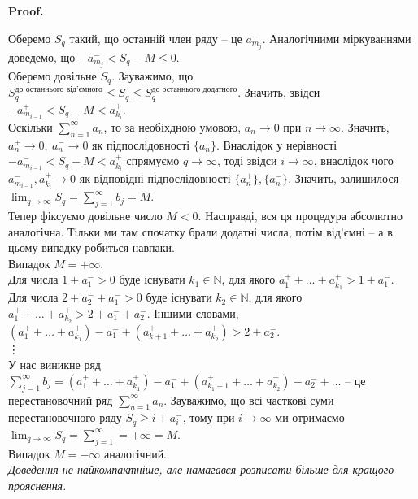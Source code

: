 \documentclass[a4paper, 10pt]{article}
\makeatletter
\def\qed{$\blacksquare$}
\theoremstyle{theoremdd}
\theoremstyle{theoremdd}
\theoremstyle{theoremdd}
\theoremstyle{theoremdd}
\theoremstyle{theoremdd}
\theoremstyle{theoremdd}
\theoremstyle{theoremdd}
\theoremstyle{theoremdd}
\theoremstyle{theoremdd}
\renewenvironment{proof}[1][Proof.\\]{\par
\pushQED{\hfill \qed}%
\normalfont \topsep6\p@\@plus6\p@\relax
\trivlist
\item\relax
{\bfseries
#1\@addpunct{.}}\hspace\labelsep\ignorespaces
}{%
\popQED\endtrivlist\@endpefalse
}
\makeatother
\begin{document}
\begin{proof}
Оберемо $S_q$ такий, що останній член ряду -- це $a_{m_j}^-$. Аналогічними міркуваннями доведемо, що $-a_{m_j}^- < S_q - M \leq 0$.\\
Оберемо довільне $S_q$. Зауважимо, що $S^{\text{до останнього від'ємного}}_{q} \leq S_q \leq S_q^{\text{до останнього додатного}}$. Значить, звідси\\
$-a_{m_{i-1}}^+ < S_q - M < a_{k_i}^+$.\\
Оскільки $\displaystyle\sum_{n=1}^\infty a_n$, то за необіхдною умовою, $a_n \to 0$ при $n \to \infty$. Значить, $a_n^+ \to 0,\ a_n^- \to 0$ як підпослідовності $\{a_n\}$. Внаслідок у нерівності $-a_{m_{i-1}}^- < S_q - M < a_{k_i}^+$ спрямуємо $q \to \infty$, тоді звідси $i \to \infty$, внаслідок чого $a_{m_{i-1}}^-, a_{k_i}^+ \to 0$ як відповідні підпослідовності $\{a_n^+\},\{a_n^-\}$. Значить, залишилося $\displaystyle\lim_{q \to \infty} S_q = \sum_{j=1}^\infty b_j = M$.
\bigskip \\
Тепер фіксуємо довільне число $M < 0$. Насправді, вся ця процедура абсолютно аналогічна. Тільки ми там спочатку брали додатні числа, потім від'ємні -- а в цьому випадку робиться навпаки.
\bigskip \\
Випадок $M = +\infty$.\\
Для числа $1 + a_1^- > 0$ буде існувати $k_1 \in \mathbb{N}$, для якого $a_1^+ + \dots + a_{k_1}^+ > 1 + a_1^-$.\\
Для числа $2 + a_2^- + a_1^- > 0$ буде існувати $k_2 \in \mathbb{N}$, для якого $a_{1}^+ + \dots + a_{k_2}^+ > 2 + a_1^- + a_2^-$. Іншими словами, $(a_1^+ + \dots + a_{k_1}^+) - a_1^- + (a_{k+1}^+ + \dots + a_{k_2}^+) > 2 + a_2^-$.\\
\vdots \\
У нас виникне ряд $\displaystyle\sum_{j=1}^\infty b_j = (a_1^+ + \dots + a_{k_1}^+) - a_1^- + (a_{k_1+1}^+ + \dots + a_{k_2}^+) - a_2^- + \dots$ -- це перестановочний ряд $\displaystyle\sum_{n=1}^\infty a_n$. Зауважимо, що всі часткові суми перестановочного ряду $S_q \geq i + a_i^-$, тому при $i \to \infty$ ми отримаємо $\displaystyle\lim_{q \to \infty} S_q = \sum_{j=1}^\infty = +\infty = M$.
\bigskip \\
Випадок $M = -\infty$ аналогічний.\\
\textit{Доведення не найкомпактніше, але намагався розписати більше для кращого прояснення.}
\end{proof}
\end{document}
